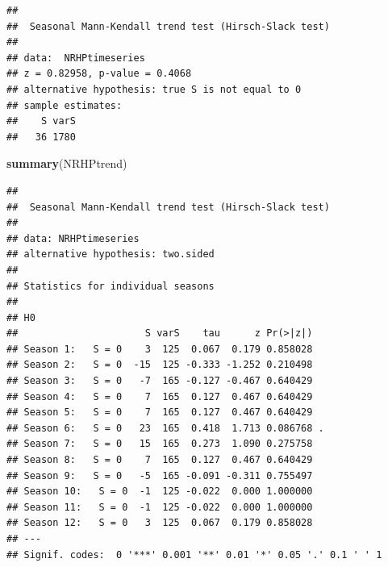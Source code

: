 \documentclass[12pt,]{article}
\newenvironment{Shaded}{\begin{snugshade}}{\end{snugshade}}
\newcommand{\CommentTok}[1]{\textcolor[rgb]{0.56,0.35,0.01}{\textit{#1}}}
\newcommand{\DataTypeTok}[1]{\textcolor[rgb]{0.13,0.29,0.53}{#1}}
\newcommand{\DecValTok}[1]{\textcolor[rgb]{0.00,0.00,0.81}{#1}}
\newcommand{\KeywordTok}[1]{\textcolor[rgb]{0.13,0.29,0.53}{\textbf{#1}}}
\newcommand{\NormalTok}[1]{#1}
\newcommand{\OperatorTok}[1]{\textcolor[rgb]{0.81,0.36,0.00}{\textbf{#1}}}
\newcommand{\StringTok}[1]{\textcolor[rgb]{0.31,0.60,0.02}{#1}}
\begin{document}
\begin{Shaded}
\end{Shaded}

\begin{verbatim}
## 
##  Seasonal Mann-Kendall trend test (Hirsch-Slack test)
## 
## data:  NRHPtimeseries
## z = 0.82958, p-value = 0.4068
## alternative hypothesis: true S is not equal to 0
## sample estimates:
##    S varS 
##   36 1780
\end{verbatim}

\begin{Shaded}
\begin{Highlighting}[]
\KeywordTok{summary}\NormalTok{(NRHPtrend)}
\end{Highlighting}
\end{Shaded}

\begin{verbatim}
## 
##  Seasonal Mann-Kendall trend test (Hirsch-Slack test)
## 
## data: NRHPtimeseries
## alternative hypothesis: two.sided
## 
## Statistics for individual seasons
## 
## H0
##                      S varS    tau      z Pr(>|z|)  
## Season 1:   S = 0    3  125  0.067  0.179 0.858028  
## Season 2:   S = 0  -15  125 -0.333 -1.252 0.210498  
## Season 3:   S = 0   -7  165 -0.127 -0.467 0.640429  
## Season 4:   S = 0    7  165  0.127  0.467 0.640429  
## Season 5:   S = 0    7  165  0.127  0.467 0.640429  
## Season 6:   S = 0   23  165  0.418  1.713 0.086768 .
## Season 7:   S = 0   15  165  0.273  1.090 0.275758  
## Season 8:   S = 0    7  165  0.127  0.467 0.640429  
## Season 9:   S = 0   -5  165 -0.091 -0.311 0.755497  
## Season 10:   S = 0  -1  125 -0.022  0.000 1.000000  
## Season 11:   S = 0  -1  125 -0.022  0.000 1.000000  
## Season 12:   S = 0   3  125  0.067  0.179 0.858028  
## ---
## Signif. codes:  0 '***' 0.001 '**' 0.01 '*' 0.05 '.' 0.1 ' ' 1
\end{verbatim}
\end{document}
